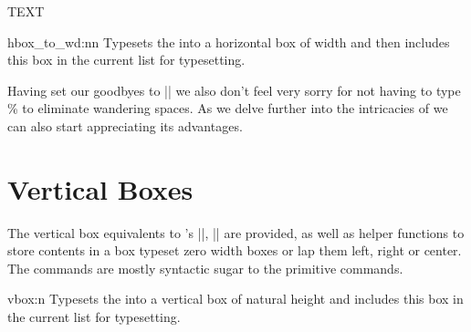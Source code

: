 { \sffamily \Huge \colorbox{nice}{\color{white}TEXT}}

\begin{docCommand}{hbox_to_wd:nn}{  }
   Typesets the  into a horizontal box of width
    and then includes this box in the current list for
   typesetting.
\end{docCommand}


Having set our goodbyes to |\hb@xt@| we also don’t feel very sorry for not having to type \% to eliminate wandering spaces. As we delve further into the intricacies of  we can also start appreciating its advantages.


\section{Vertical Boxes}
The vertical box equivalents to \tex’s |\vbox|, |\vtop| are provided, as well as helper functions to store contents in a box typeset zero width boxes or lap them left, right or center. The commands are mostly syntactic sugar to the primitive commands. 

\begin{docCommand}{vbox:n}{}
Typesets the  into a vertical box of natural height and includes this box in the current list for typesetting.
\end{docCommand}

